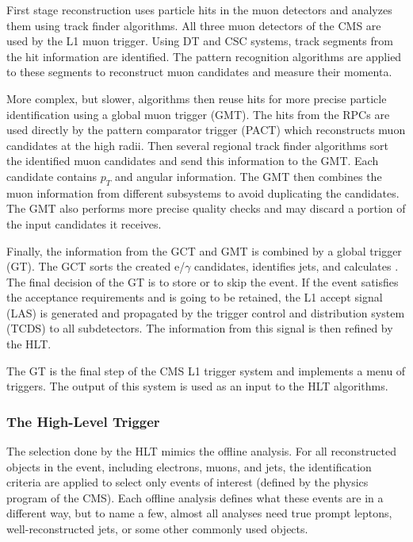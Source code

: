 \begin{normalsize}
First stage reconstruction uses particle hits in the muon detectors and analyzes them using track finder algorithms. All three muon detectors of the CMS are used by the L1 muon trigger. Using DT and CSC systems, track segments from the hit information are identified. The pattern recognition algorithms are applied to these segments to reconstruct muon candidates and measure their momenta. 

More complex, but slower, algorithms then reuse hits for more precise particle identification using a global muon trigger (GMT). The hits from the RPCs are used directly by the pattern comparator trigger (PACT) which reconstructs muon candidates at the high radii. Then several regional track finder algorithms sort the identified muon candidates and send this information to the GMT. Each candidate contains $p_T$ and angular information. The GMT then combines the muon information from different subsystems to avoid duplicating the candidates. The GMT also performs more precise quality checks and may discard a portion of the input candidates it receives. 

Finally, the information from the GCT and GMT is combined by a global trigger (GT). The GCT sorts the created e/$\gamma$ candidates, identifies jets, and calculates \ETslash. The final decision of the GT is to store or to skip the event. If the event satisfies the acceptance requirements and is going to be retained, the L1 accept signal (LAS) is generated and propagated by the trigger control and distribution system (TCDS) to all subdetectors. The information from this signal is then refined by the HLT.


The GT is the final step of the CMS L1 trigger system and implements a menu of triggers. The output of this system is used as an input to the HLT algorithms. 



\subsubsection{The High-Level Trigger}

The selection done by the HLT mimics the offline analysis. For all reconstructed objects in the event, including electrons, muons, and jets, the identification criteria are applied to select only events of interest (defined by the physics program of the CMS). Each offline analysis defines what these events are in a different way, but to name a few, almost all analyses need true prompt leptons, well-reconstructed jets, or some other commonly used objects. 



\end{normalsize}

